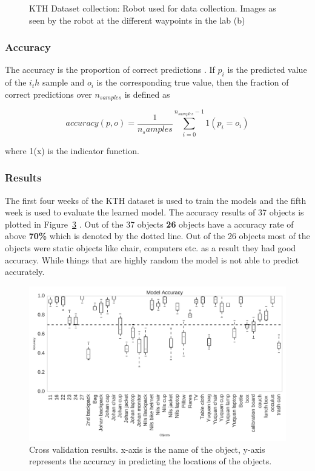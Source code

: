 \begin{figure}
\begin{subfigure}[b]{0.6\textwidth}
        \caption{}
        \label{fig:robot-view}
    \end{subfigure}
    \caption[KTH dataset collection]{KTH Dataset collection: \cite{SCITOS_G5} Robot used for data collection. Images  as seen by the robot at the different waypoints in the lab (b) \cite{krajnik_wheres_2015} }\label{fig:kth-dataset}
\end{figure}




\subsubsection*{Accuracy }

The accuracy is the proportion of correct predictions \cite{scikit-learn} . If $p_i$ is the predicted value of the $i_th$ sample and $o_i$ is the corresponding true value, then the fraction of correct predictions over $n_{samples}$ is defined as 

\begin{equation}
	accuracy(p, o) = \frac{1}{n_samples} \sum_{i=0}^{n_{samples} -1 }1(p_i = o_i)
\end{equation} 

where 1(x) is the indicator function.


\subsubsection*{Results}

The first four weeks of the KTH dataset is used to train the models and the fifth week is used to evaluate the learned model. The accuracy results of 37 objects is plotted in Figure~\ref{fig:kth_object_evaluation} . 
Out of the 37 objects \textbf{26} objects have a accuracy rate of above \textbf{70\%} which is denoted by the dotted line. Out of the 26 objects most of the objects were static objects like chair, computers etc. as a result they had good accuracy. While things that are highly random the model is not able to predict accurately.

\begin{figure}[htp]
\centering
\includegraphics[width=\textwidth]{images/evaluation_kth.png}
\caption[Cross validation results]{Cross validation results. x-axis is the name of the object, y-axis represents the accuracy in predicting the locations of the objects. }
\label{fig:kth_object_evaluation}
\end{figure}

